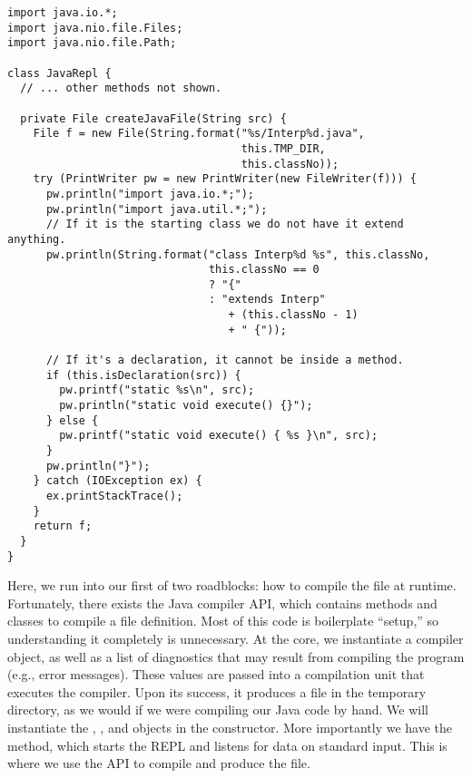 \begin{lstlisting}[language=MyJava]
import java.io.*;
import java.nio.file.Files;
import java.nio.file.Path;

class JavaRepl {
  // ... other methods not shown.
  
  private File createJavaFile(String src) {
    File f = new File(String.format("%s/Interp%d.java",
                                    this.TMP_DIR, 
                                    this.classNo));
    try (PrintWriter pw = new PrintWriter(new FileWriter(f))) {
      pw.println("import java.io.*;");
      pw.println("import java.util.*;");
      // If it is the starting class we do not have it extend anything.
      pw.println(String.format("class Interp%d %s", this.classNo,
                               this.classNo == 0
                               ? "{" 
                               : "extends Interp" 
                                  + (this.classNo - 1) 
                                  + " {"));

      // If it's a declaration, it cannot be inside a method.
      if (this.isDeclaration(src)) {
        pw.printf("static %s\n", src);
        pw.println("static void execute() {}");
      } else {
        pw.printf("static void execute() { %s }\n", src);
      }
      pw.println("}");
    } catch (IOException ex) {
      ex.printStackTrace();
    }
    return f;
  }
}
\end{lstlisting}

Here, we run into our first of two roadblocks: how to compile the file at runtime. 
Fortunately, there exists the Java compiler API, which contains methods and classes to compile a file definition. 
Most of this code is boilerplate ``setup,'' so understanding it completely is unnecessary. 
At the core, we instantiate a compiler object, as well as a list of diagnostics that may result from compiling the program (e.g., error messages). 
These values are passed into a compilation unit that executes the compiler. 
Upon its success, it produces a  file in the temporary directory, as we would if we were compiling our Java code by hand. 
We will instantiate the , , and  objects in the constructor. 
More importantly we have the  method, which starts the REPL and listens for data on standard input. 
This is where we use the API to compile and produce the  file.   


